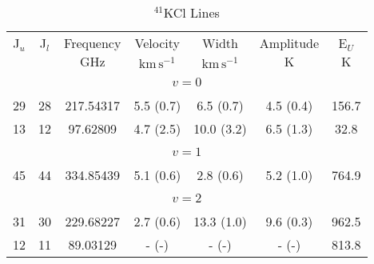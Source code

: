 \begin{table*}[htp]
\centering
\caption{$^{41}$KCl Lines}
\begin{tabular}{ccccccc}
\label{tab:41KCl_salt_lines}
 J$_u$ & J$_l$ & Frequency & Velocity & Width & Amplitude & E$_U$ \\
  &  & $\mathrm{GHz}$ & $\mathrm{km\,s^{-1}}$ & $\mathrm{km\,s^{-1}}$ & $\mathrm{K}$ & $\mathrm{K}$ \\
\hline
&\vspace{-0.75em}\\
\multicolumn{7}{c}{$v = 0$} \\
\vspace{-0.75em}\\
 29 & 28 & 217.54317 & 5.5 (0.7) & 6.5 (0.7) & 4.5 (0.4) & 156.7 \\
 13 & 12 & 97.62809 & 4.7 (2.5) & 10.0 (3.2) & 6.5 (1.3) & 32.8 \\
&\vspace{-0.75em}\\
\multicolumn{7}{c}{$v = 1$} \\
\vspace{-0.75em}\\
 45 & 44 & 334.85439 & 5.1 (0.6) & 2.8 (0.6) & 5.2 (1.0) & 764.9 \\
&\vspace{-0.75em}\\
\multicolumn{7}{c}{$v = 2$} \\
\vspace{-0.75em}\\
 31 & 30 & 229.68227 & 2.7 (0.6) & 13.3 (1.0) & 9.6 (0.3) & 962.5 \\
 12 & 11 & 89.03129 & - (-) & - (-) & - (-) & 813.8 \\
\hline
\end{tabular}

\par 
\end{table*}
